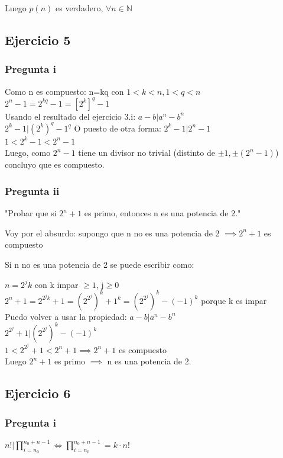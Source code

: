 Luego $p(n)$ es verdadero, $ \forall n \in \mathbb{N} $

\subsection{Ejercicio 5}
\subsubsection{Pregunta i}
Como n es compuesto: n=kq con $1<k<n, 1<q<n$ \\
$2^{n}-1=2^{kq}-1=[2^{k}]^{q}-1$ \\
Usando el resultado del ejercicio 3.i: $a-b | a^n-b^n$ \\
$2^k-1 | (2^{k})^{q}-1^q$ O puesto de otra forma: $2^k-1 | 2^n-1$ \\
$1 < 2^k-1 < 2^n-1$ \\
Luego, como $2^{n}-1$ tiene un divisor no trivial (distinto de $\pm1, \pm(2^{n}-1)$) concluyo que es compuesto.
\subsubsection{Pregunta ii}
"Probar que si $2^{n}+1$ es primo, entonces n es una potencia de 2."

Voy por el absurdo: supongo que n no es una potencia de 2 $\implies 2^{n}+1$ es compuesto

Si n no es una potencia de 2 se puede escribir como:

$n = 2^{j}k$ con k impar $\geq 1$, j$\geq 0$ \\
$2^{n}+1=2^{2^jk}+1=(2^{2^j})^k+1^k=(2^{2^j})^k-(-1)^k$ porque k es impar \\
Puedo volver a usar la propiedad: $a-b | a^n-b^n$ \\
$2^{2^j}+1 | (2^{2^j})^k-(-1)^k$ \\
$1 < 2^{2^j}+1 < 2^{n}+1 \implies 2^{n}+1$ es compuesto \\
Luego $2^{n}+1$ es primo $\implies$ n es una potencia de 2.

\subsection{Ejercicio 6}
\subsubsection{Pregunta i}
$ n! | \prod_{i = n_0}^{n_0 + n - 1} \iff \prod_{i = n_0}^{n_0 + n - 1} = k\cdot n!$

